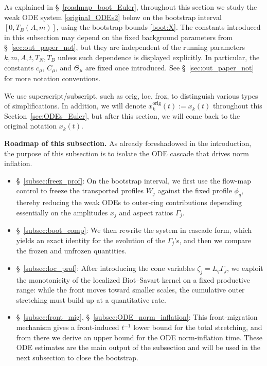 \documentclass[reqno,11pt]{amsart}
\begin{document}
As explained in \S~\ref{roadmap_boot_Euler}, throughout this section we study the weak ODE system \eqref{original_ODEs2} below
on the bootstrap interval $[0,T_B(A,m)]$, using the bootstrap bounds \eqref{boot:X}. 
The constants introduced in this subsection may depend on the fixed background parameters from \S~\ref{sec:out_paper_not}, but they are independent of the running parameters $k,m,A,t,T_N,T_B$ unless such dependence is displayed explicitly. 
In particular, the constants $c_\mu$, $C_\mu$, and $\Theta_\mu$ are fixed once introduced. See \S~\ref{sec:out_paper_not} for more notation conventions.

We use superscript/subscript, such as orig, loc, froz, to distinguish various types of simplifications. In addition, we will denote $x_k^{\mathrm{orig}}(t):=x_k(t)$ throughout this Section~\ref{sec:ODEs_Euler}, but after this section, we will come back to the original notation $x_k(t)$.


\medskip
\noindent\textbf{Roadmap of this subsection.}
As already foreshadowed in the introduction, the purpose of this subsection is to isolate the ODE cascade that drives norm inflation. 
\begin{itemize}
\item  \S~\ref{subsec:freez_prof}:
On the bootstrap interval, we first use the flow-map control to freeze the transported profiles \(W_j\) against the fixed profile \(\phi_q\), thereby reducing the weak ODEs to outer-ring contributions depending essentially on the amplitudes \(x_j\) and aspect ratios \(\Gamma_j\).
\item  \S~\ref{subsec:boot_comp}:
We then rewrite the system in cascade form, which yields an exact identity for the evolution of the \(\Gamma_j\)'s, and then we  compare the frozen and unfrozen quantities. 
\item  \S~\ref{subsec:loc_prof}:
After introducing the cone variables \(\zeta_j=L_q\Gamma_j\), we exploit the monotonicity of the localized Biot--Savart kernel on a fixed productive range: while the front moves toward smaller scales, the cumulative outer stretching must build up at a quantitative rate. 
\item \S~\ref{subsec:front_mig}, \S~\ref{subsec:ODE_norm_inflation}:
This front-migration mechanism gives a front-induced \(t^{-1}\) lower bound for the total stretching, and from there we derive an upper bound for the ODE norm-inflation time. These ODE estimates are the main output of the subsection and will be used in the next subsection to close the bootstrap.
\end{itemize}
\end{document}
